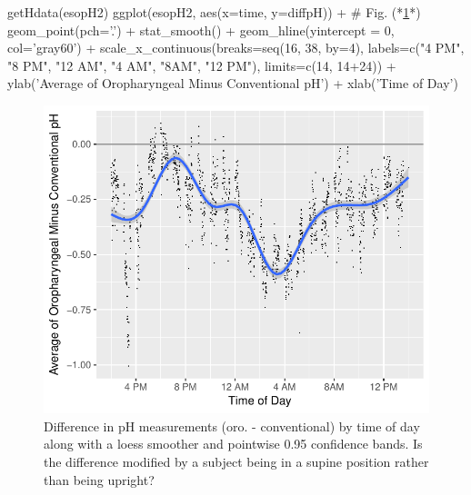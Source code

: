 \begin{Schunk}
\begin{Sinput}
getHdata(esopH2)
ggplot(esopH2, aes(x=time, y=diffpH)) +    # Fig. (*\ref{fig:corr-phtimediff}*)
       geom_point(pch='.') + stat_smooth() +
       geom_hline(yintercept = 0, col='gray60') +
       scale_x_continuous(breaks=seq(16, 38, by=4),
                          labels=c("4 PM", "8 PM", "12 AM",
                            "4 AM", "8AM", "12 PM"),
                          limits=c(14, 14+24)) +
       ylab('Average of Oropharyngeal Minus Conventional pH') +
       xlab('Time of Day')
\end{Sinput}
\begin{figure}[htbp]

\centerline{\includegraphics[width=\maxwidth]{corr-phtimediff-1} }

\caption[Difference in pH by time of day]{Difference in pH measurements (oro. - conventional) by time of day along with a loess smoother and pointwise 0.95 confidence bands.  Is the difference modified by a subject being in a supine position rather than being upright?}\label{fig:corr-phtimediff}
\end{figure}
\end{Schunk}

